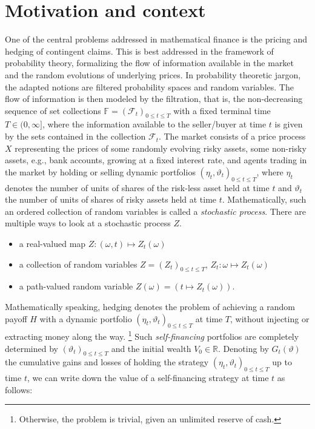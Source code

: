 \documentclass[11pt,a4paper,twoside,openany]{report}
\theoremstyle{plain} %
\theoremstyle{definition} %
\theoremstyle{remark} %
\begin{document}
\section{Motivation and context}
\label{sec:introduction-motivation-context}
One of the central problems addressed in mathematical finance is the pricing and hedging of contingent claims. This is best addressed in the framework of probability theory, formalizing the flow of information available in the market and the random evolutions of underlying prices. In probability theoretic jargon, the adapted notions are filtered probability spaces and random variables. The flow of information is then modeled by the filtration, that is, the non-decreasing sequence of set
collections \(\mathbb{F}=(\mathcal{F}_t)_{0\leq t\leq T}\) with a fixed terminal time \(T\in(0,\infty]\), where the information available to the seller/buyer at time \(t\) is given by the sets contained in the collection \(\mathcal{F}_t\). The market consists of a price process \(X\) representing the prices of some randomly evolving risky assets, some non-risky assets, e.g., bank accounts, growing at a fixed interest rate, and agents trading in the market by holding or selling dynamic portfolios \((\eta_t,\vartheta_t)_{0\leq t\leq T}\), where \(\eta_t\) denotes the number of units of shares of the risk-less asset held at time \(t\) and \(\vartheta_t\) the number of units of shares of risky assets held at time \(t\). 
Mathematically, such an ordered collection of random variables is called a \textit{stochastic process}. There are multiple ways to look at a stochastic process \(Z\).
\begin{itemize}
    \item a real-valued map \(Z:(\omega,t)\mapsto Z_t(\omega)\)
    \item a collection of random variables \(Z=(Z_t)_{0\leq t\leq T}\), \(Z_t:\omega\mapsto Z_t(\omega)\)
    \item a path-valued random variable \(Z(\omega)=\left(t\mapsto Z_t(\omega)\right)\).
\end{itemize}Mathematically speaking, hedging denotes the problem of achieving a random payoff \(H\) with a dynamic portfolio  \((\eta_t,\vartheta_t)_{0\leq t\leq T}\) at time \(T\), without injecting or extracting money along the way. \footnote{Otherwise, the problem is trivial, given an unlimited reserve of cash.} Such \textit{self-financing} portfolios are completely determined by \((\vartheta_t)_{0\leq t\leq T}\) and the initial wealth \(V_0\in\mathbb{R}\). Denoting by \(G_t(\vartheta)\) the cumulative gains and losses of holding the strategy \((\eta_t,\vartheta_t)_{0\leq t\leq T}\)  up to time \(t\), we can write down the value of a self-financing strategy at time \(t\) as follows:
\end{document}
